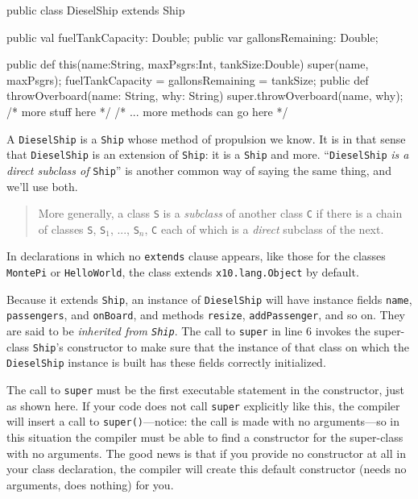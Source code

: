 \begin{xtennum}[]
  public class DieselShip extends Ship {
    public val fuelTankCapacity: Double; 
    public var gallonsRemaining: Double;
    
    public def this(name:String, maxPsgrs:Int, tankSize:Double) {
       super(name, maxPsgrs);
       fuelTankCapacity = gallonsRemaining = tankSize;
    }
    public def throwOverboard(name: String, why: String) {
      super.throwOverboard(name, why);
      /* more stuff here */
    }
    /* ... more methods can go here */
 }
\end{xtennum}

A {\tt DieselShip} is a {\tt Ship} whose method of propulsion we know.  It is
in that sense that {\tt DieselShip} is an extension of {\tt Ship}: it is a
{\tt Ship} and more.  ``{\tt DieselShip} {\em is a direct
subclass of} {\tt Ship}'' is another common way of saying the same thing,
and we'll use both.
 \begin{quote}
More generally, a class {\tt S} is a {\em subclass} of another class {\tt C} if
there is a chain of classes {\tt S}, {\tt S$_{1}$}, ..., {\tt S$_{n}$}, {\tt C}
each of which is a {\em direct} subclass of the next.
\end{quote}
In declarations in which no {\tt extends}
clause appears, like those for the classes {\tt MontePi} or {\tt HelloWorld}, 
the class extends {\tt x10.lang.Object} by default.

Because it extends {\tt Ship}, an instance of {\tt DieselShip} will have
instance fields {\tt name}, {\tt passengers}, and {\tt on\-Board}, and methods
{\tt resize}, {\tt add\-Pas\-sen\-ger}, and so on.  They are said to be {\em
inherited from {\tt Ship}}.  The call to {\tt super} in line 6 invokes the
super-class {\tt Ship}'s constructor to make sure that the instance of that
class on which the {\tt DieselShip} instance is built has these fields correctly
initialized. 

The call to {\tt super} must be the first executable statement in the
constructor, just as shown here.  If your code does not call {\tt super}
explicitly like this, the compiler will insert a call to {\tt super()}---notice:
the call is made with no arguments---so in this situation the compiler must be able to
find a constructor for the super-class with no arguments. The good news is that
if you provide no constructor at all in your class declaration, the compiler will
create this default constructor (needs no arguments, does nothing) for you.

